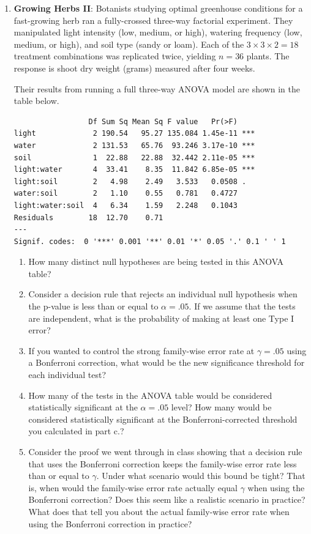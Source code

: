 \documentclass[
  letterpaper,
  DIV=11,
  numbers=noendperiod]{scrartcl}
\begin{document}
\begin{enumerate}
\def\labelenumi{\arabic{enumi}.}
\setcounter{enumi}{2}
\item
  \textbf{Growing Herbs II}: Botanists studying optimal greenhouse
  conditions for a fast-growing herb ran a fully-crossed three-way
  factorial experiment. They manipulated light intensity (low, medium,
  or high), watering frequency (low, medium, or high), and soil type
  (sandy or loam). Each of the \(3 \times 3 \times 2 = 18\) treatment
  combinations was replicated twice, yielding \(n = 36\) plants. The
  response is shoot dry weight (grams) measured after four weeks.

  Their results from running a full three-way ANOVA model are shown in
  the table below.

\begin{verbatim}
                 Df Sum Sq Mean Sq F value   Pr(>F)    
light             2 190.54   95.27 135.084 1.45e-11 ***
water             2 131.53   65.76  93.246 3.17e-10 ***
soil              1  22.88   22.88  32.442 2.11e-05 ***
light:water       4  33.41    8.35  11.842 6.85e-05 ***
light:soil        2   4.98    2.49   3.533   0.0508 .  
water:soil        2   1.10    0.55   0.781   0.4727    
light:water:soil  4   6.34    1.59   2.248   0.1043    
Residuals        18  12.70    0.71                     
---
Signif. codes:  0 '***' 0.001 '**' 0.01 '*' 0.05 '.' 0.1 ' ' 1
\end{verbatim}

  \begin{enumerate}
  \def\labelenumii{\alph{enumii}.}
  \item
    How many distinct null hypotheses are being tested in this ANOVA
    table?
  \item
    Consider a decision rule that rejects an individual null hypothesis
    when the p-value is less than or equal to \(\alpha = .05\). If we
    assume that the tests are independent, what is the probability of
    making at least one Type I error?
  \item
    If you wanted to control the strong family-wise error rate at
    \(\gamma = .05\) using a Bonferroni correction, what would be the
    new significance threshold for each individual test?
  \item
    How many of the tests in the ANOVA table would be considered
    statistically significant at the \(\alpha = .05\) level? How many
    would be considered statistically significant at the
    Bonferroni-corrected threshold you calculated in part c.?
  \item
    Consider the proof we went through in class showing that a decision
    rule that uses the Bonferroni correction keeps the family-wise error
    rate less than or equal to \(\gamma\). Under what scenario would
    this bound be tight? That is, when would the family-wise error rate
    actually equal \(\gamma\) when using the Bonferroni correction? Does
    this seem like a realistic scenario in practice? What does that tell
    you about the actual family-wise error rate when using the
    Bonferroni correction in practice?
  \end{enumerate}
\end{enumerate}
\end{document}
